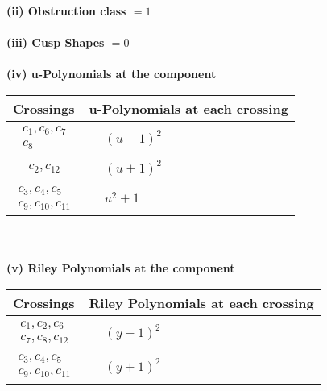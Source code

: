 \documentclass[1p]{elsarticle_modified}
\theoremstyle{definition}
\begin{document}
\flushleft \textbf{(ii) Obstruction class $= 1$}\\~\\
\flushleft \textbf{(iii) Cusp Shapes $= 0$}\\~\\
\newpage\renewcommand{\arraystretch}{1}
\flushleft \textbf{(iv) u-Polynomials at the component}\newline \\
\begin{tabular}{m{50pt}|m{274pt}}
Crossings & \hspace{64pt}u-Polynomials at each crossing \\
\hline $$\begin{aligned}c_{1},c_{6},c_{7}\\c_{8}\end{aligned}$$&$\begin{aligned}
&(u-1)^2
\end{aligned}$\\
\hline $$\begin{aligned}c_{2},c_{12}\end{aligned}$$&$\begin{aligned}
&(u+1)^2
\end{aligned}$\\
\hline $$\begin{aligned}c_{3},c_{4},c_{5}\\c_{9},c_{10},c_{11}\end{aligned}$$&$\begin{aligned}
&u^2+1
\end{aligned}$\\
\hline
\end{tabular}\\~\\
\newpage\renewcommand{\arraystretch}{1}
\flushleft \textbf{(v) Riley Polynomials at the component}\newline \\
\begin{tabular}{m{50pt}|m{274pt}}
Crossings & \hspace{64pt}Riley Polynomials at each crossing \\
\hline $$\begin{aligned}c_{1},c_{2},c_{6}\\c_{7},c_{8},c_{12}\end{aligned}$$&$\begin{aligned}
&(y-1)^2
\end{aligned}$\\
\hline $$\begin{aligned}c_{3},c_{4},c_{5}\\c_{9},c_{10},c_{11}\end{aligned}$$&$\begin{aligned}
&(y+1)^2
\end{aligned}$\\
\hline
\end{tabular}\\~\\
\end{document}
